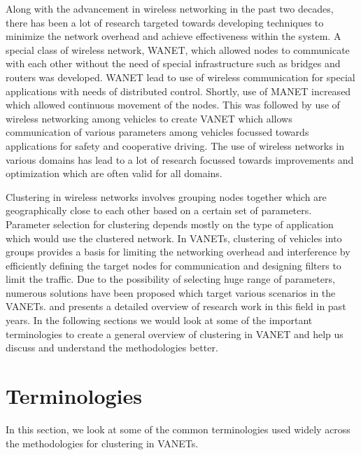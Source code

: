 \documentclass[]{ccs-thesis}
\begin{document}
Along with the advancement in wireless networking in the past two decades, there has been a lot of research targeted
towards developing techniques to minimize the network overhead and achieve effectiveness within the system. A special
class of wireless network, \ac{WANET},  which allowed nodes to communicate with each other without the need of
special infrastructure such as bridges and routers was developed. \ac{WANET} lead to use of wireless communication
for special applications with needs of distributed control. Shortly, use of \ac{MANET} increased which allowed
continuous movement of the nodes. This was followed by use of wireless networking among vehicles to create \ac{VANET}
which allows communication of various parameters among vehicles focussed towards applications for safety and cooperative
driving. The use of wireless networks in various domains has lead to a lot of research focussed towards improvements
and optimization which are often valid for all domains.

Clustering in wireless networks involves grouping nodes together which are geographically close to each other based on a
certain set of parameters. Parameter selection for clustering depends mostly on the type of application which would use
the clustered network. In \ac{VANET}s, clustering of vehicles into groups provides a basis for limiting the networking
overhead and interference by efficiently defining the target nodes for communication and designing filters to limit the traffic.
Due to the possibility of selecting huge range of parameters, numerous solutions have been proposed which target various
scenarios in the \ac{VANET}s. \textcite{6256251} and \textcite{BALI2014134} presents a detailed overview of research work in this
field in past years. In the following sections we would look at some of the important terminologies to create
a general overview of clustering in \ac{VANET} and help us discuss and understand the methodologies better.

\section{Terminologies}

In this section, we look at some of the common terminologies used widely across the methodologies
for clustering in \ac{VANET}s.
\end{document}
